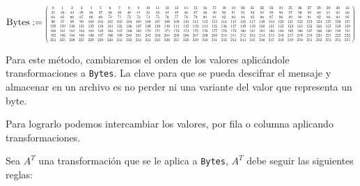 \documentclass[a4paper]{article}
\newcommand*{\Scale}[2][4]{\scalebox{#1}{$#2$}}%
\begin{document}
\[
\text{Bytes} := \Scale[0.4]{
\left(
\begin{array}{cccccccccccccccccccccccccccccccc}
 0 & 1 & 2 & 3 & 4 & 5 & 6 & 7 & 8 & 9 & 10 & 11 & 12 & 13 & 14 & 15 & 16 & 17
& 18 & 19 & 20 & 21 & 22 & 23 & 24 & 25 & 26 & 27 & 28 & 29 & 30 & 31 \\
 32 & 33 & 34 & 35 & 36 & 37 & 38 & 39 & 40 & 41 & 42 & 43 & 44 & 45 & 46 & 47
& 48 & 49 & 50 & 51 & 52 & 53 & 54 & 55 & 56 & 57 & 58 & 59 & 60 & 61 & 62 & 63
\\
 64 & 65 & 66 & 67 & 68 & 69 & 70 & 71 & 72 & 73 & 74 & 75 & 76 & 77 & 78 & 79
& 80 & 81 & 82 & 83 & 84 & 85 & 86 & 87 & 88 & 89 & 90 & 91 & 92 & 93 & 94 & 95
\\
 96 & 97 & 98 & 99 & 100 & 101 & 102 & 103 & 104 & 105 & 106 & 107 & 108 & 109
& 110 & 111 & 112 & 113 & 114 & 115 & 116 & 117 & 118 & 119 & 120 & 121 & 122 &
123 & 124 & 125 & 126 & 127 \\
 128 & 129 & 130 & 131 & 132 & 133 & 134 & 135 & 136 & 137 & 138 & 139 & 140 &
141 & 142 & 143 & 144 & 145 & 146 & 147 & 148 & 149 & 150 & 151 & 152 & 153 &
154 & 155 & 156 & 157 & 158 & 159 \\
 160 & 161 & 162 & 163 & 164 & 165 & 166 & 167 & 168 & 169 & 170 & 171 & 172 &
173 & 174 & 175 & 176 & 177 & 178 & 179 & 180 & 181 & 182 & 183 & 184 & 185 &
186 & 187 & 188 & 189 & 190 & 191 \\
 192 & 193 & 194 & 195 & 196 & 197 & 198 & 199 & 200 & 201 & 202 & 203 & 204 &
205 & 206 & 207 & 208 & 209 & 210 & 211 & 212 & 213 & 214 & 215 & 216 & 217 &
218 & 219 & 220 & 221 & 222 & 223 \\
 224 & 225 & 226 & 227 & 228 & 229 & 230 & 231 & 232 & 233 & 234 & 235 & 236 &
237 & 238 & 239 & 240 & 241 & 242 & 243 & 244 & 245 & 246 & 247 & 248 & 249 &
250 & 251 & 252 & 253 & 254 & 255 \\
\end{array}
\right)
}
\]

Para este método, cambiaremos el orden de los valores aplicándole
transformaciones a \texttt{Bytes}. La clave para que se pueda descifrar el
mensaje y almacenar en un archivo es no perder ni una variante del valor que
representa un byte.

Para lograrlo podemos intercambiar los valores, por fila o columna aplicando
transformaciones.

Sea $A^T$ una transformación que se le aplica a \texttt{Bytes}, $A^T$ debe
seguir
las siguientes reglas:
\end{document}
